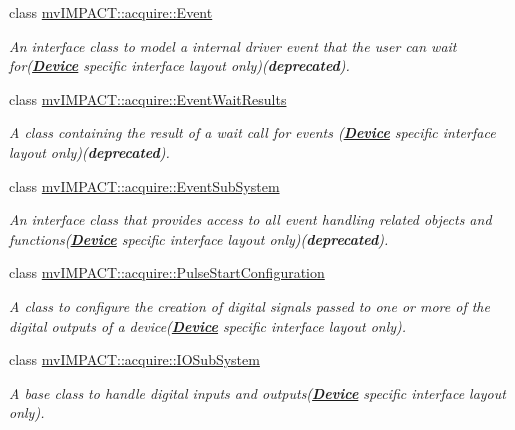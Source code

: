 \begin{DoxyCompactItemize}
class \hyperlink{classmv_i_m_p_a_c_t_1_1acquire_1_1_event}{mv\+I\+M\+P\+A\+C\+T\+::acquire\+::\+Event}
\begin{DoxyCompactList}\small\item\em An interface class to model a internal driver event that the user can wait for({\bfseries \hyperlink{classmv_i_m_p_a_c_t_1_1acquire_1_1_device}{Device}} specific interface layout only)({\bfseries deprecated}). \end{DoxyCompactList}\item 
class \hyperlink{classmv_i_m_p_a_c_t_1_1acquire_1_1_event_wait_results}{mv\+I\+M\+P\+A\+C\+T\+::acquire\+::\+Event\+Wait\+Results}
\begin{DoxyCompactList}\small\item\em A class containing the result of a wait call for events ({\bfseries \hyperlink{classmv_i_m_p_a_c_t_1_1acquire_1_1_device}{Device}} specific interface layout only)({\bfseries deprecated}). \end{DoxyCompactList}\item 
class \hyperlink{classmv_i_m_p_a_c_t_1_1acquire_1_1_event_sub_system}{mv\+I\+M\+P\+A\+C\+T\+::acquire\+::\+Event\+Sub\+System}
\begin{DoxyCompactList}\small\item\em An interface class that provides access to all event handling related objects and functions({\bfseries \hyperlink{classmv_i_m_p_a_c_t_1_1acquire_1_1_device}{Device}} specific interface layout only)({\bfseries deprecated}). \end{DoxyCompactList}\item 
class \hyperlink{classmv_i_m_p_a_c_t_1_1acquire_1_1_pulse_start_configuration}{mv\+I\+M\+P\+A\+C\+T\+::acquire\+::\+Pulse\+Start\+Configuration}
\begin{DoxyCompactList}\small\item\em A class to configure the creation of digital signals passed to one or more of the digital outputs of a device({\bfseries \hyperlink{classmv_i_m_p_a_c_t_1_1acquire_1_1_device}{Device}} specific interface layout only). \end{DoxyCompactList}\item 
class \hyperlink{classmv_i_m_p_a_c_t_1_1acquire_1_1_i_o_sub_system}{mv\+I\+M\+P\+A\+C\+T\+::acquire\+::\+I\+O\+Sub\+System}
\begin{DoxyCompactList}\small\item\em A base class to handle digital inputs and outputs({\bfseries \hyperlink{classmv_i_m_p_a_c_t_1_1acquire_1_1_device}{Device}} specific interface layout only). \end{DoxyCompactList}\item 

\end{DoxyCompactItemize}
